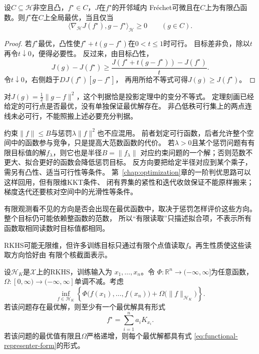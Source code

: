 \begin{theorem}[凸函数优化的一阶判据]
\label{thm:functional-convex-optimality}
设$C\subseteq\mathcal H$非空且凸，$f^\star\in C$，$J$在$f^\star$的开邻域内
Fréchet可微且在$C$上为有限凸函数。则$f^\star$在$C$上全局最优，当且仅当
\begin{equation}
 \langle\nabla_{\mathcal H}J(f^\star),g-f^\star\rangle_{\mathcal H}\geq0
 \qquad(g\in C).
 \label{eq:functional-convex-optimality}
\end{equation}
\end{theorem}
\begin{proof}
若$f^\star$最优，凸性使$f^\star+t(g-f^\star)$在$0<t\leq1$时可行。
目标差非负，除以$t$再令$t\downarrow0$，便得必要性。
反过来，由目标凸性，
\[
 J(g)-J(f^\star)\geq
 \frac{J(f^\star+t(g-f^\star))-J(f^\star)}{t}.
\]
令$t\downarrow0$，右侧趋于$DJ(f^\star)[g-f^\star]$，
再用所给不等式可得$J(g)\geq J(f^\star)$。
\end{proof}
对$J(g)=\frac12\lVert g-f\rVert^2$，这个判据恰是投影定理中的变分不等式。
定理刻画已经给定的可行点是否最优，没有单独保证最优解存在。
非凸低秩可行集上的两点连线未必可行，不能照搬上述必要充分判据。

约束$\lVert f\rVert\leq B$与惩罚$\lambda\lVert f\rVert^2$也不应混用。
前者划定可行函数，后者允许整个空间中的函数参与竞争，只是提高大范数函数的代价。
若$\lambda>0$且某个惩罚问题有有限目标值的解$f_\lambda$，则它也是半径$B=\lVert f_\lambda\rVert$
对应约束问题的一个解；否则范数不更大、拟合更好的函数会降低惩罚目标。
反方向要把给定半径对应到某个乘子，需另有凸性、适当可行性等条件。
第~\ref{chap:optimization}章的一阶判优思路可以这样回用，但有限维KKT条件、
闭有界集的紧性和迭代收敛保证不能原样搬来；梯度迭代还要核对空间中的光滑性等条件。


有限观测看不见的方向是否会出现在最优函数中，取决于惩罚怎样评价这些方向。
整个目标仍可能依赖整函数的范数，
所以“有限读取”只描述拟合项，不表示所有函数取相同读数时目标值都相同。


RKHS可能无限维，但许多训练目标只通过有限个点值读取$f$。再生性质使这些读取方向恰好由
有限个核截面表示。

\begin{theorem}[有限样本表示定理]
\label{thm:functional-representer-theorem}
设$\mathcal{H}_K$是$\mathcal{X}$上的RKHS，训练输入为
$x_1,\ldots,x_n$。令
$\Phi:\mathbb{R}^n\to(-\infty,\infty]$为任意函数，
$\Omega:[0,\infty)\to(-\infty,\infty]$单调不减。考虑
\begin{equation}
  \inf_{f\in\mathcal{H}_K}
  \left\{
    \Phi\bigl(f(x_1),\ldots,f(x_n)\bigr)
    +
    \Omega\bigl(\lVert f\rVert_{\mathcal{H}_K}\bigr)
  \right\}.
  \label{eq:functional-representer-objective}
\end{equation}
若该问题存在最优解，则至少有一个最优解具有形式
\begin{equation}
  f^\star
  =
  \sum_{i=1}^{n}a_iK_{x_i}.
  \label{eq:functional-representer-form}
\end{equation}
若该问题的最优值有限且$\Omega$严格递增，则每个最优解都具有式
\eqref{eq:functional-representer-form}的形式。
\end{theorem}


